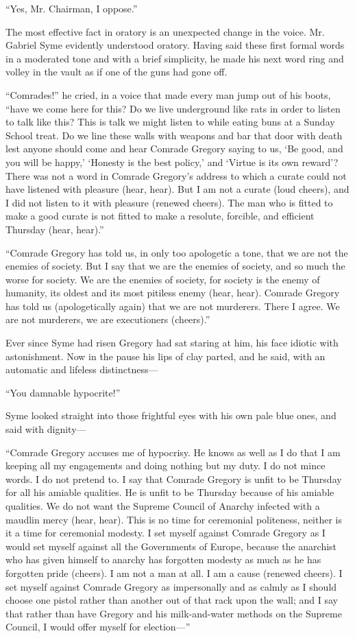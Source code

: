 “Yes, Mr. Chairman, I oppose.”

The most effective fact in oratory is an unexpected change in the voice. Mr. Gabriel Syme evidently understood oratory. Having said these first formal words in a moderated tone and with a brief simplicity, he made his next word ring and volley in the vault as if one of the guns had gone off.

“Comrades!” he cried, in a voice that made every man jump out of his boots, “have we come here for this? Do we live underground like rats in order to listen to talk like this? This is talk we might listen to while eating buns at a Sunday School treat. Do we line these walls with weapons and bar that door with death lest anyone should come and hear Comrade Gregory saying to us, ‘Be good, and you will be happy,’ ‘Honesty is the best policy,’ and ‘Virtue is its own reward’? There was not a word in Comrade Gregory’s address to which a curate could not have listened with pleasure (hear, hear). But I am not a curate (loud cheers), and I did not listen to it with pleasure (renewed cheers). The man who is fitted to make a good curate is not fitted to make a resolute, forcible, and efficient Thursday (hear, hear).”

“Comrade Gregory has told us, in only too apologetic a tone, that we are not the enemies of society. But I say that we are the enemies of society, and so much the worse for society. We are the enemies of society, for society is the enemy of humanity, its oldest and its most pitiless enemy (hear, hear). Comrade Gregory has told us (apologetically again) that we are not murderers. There I agree. We are not murderers, we are executioners (cheers).”

Ever since Syme had risen Gregory had sat staring at him, his face idiotic with astonishment. Now in the pause his lips of clay parted, and he said, with an automatic and lifeless distinctness⁠—

“You damnable hypocrite!”

Syme looked straight into those frightful eyes with his own pale blue ones, and said with dignity⁠—

“Comrade Gregory accuses me of hypocrisy. He knows as well as I do that I am keeping all my engagements and doing nothing but my duty. I do not mince words. I do not pretend to. I say that Comrade Gregory is unfit to be Thursday for all his amiable qualities. He is unfit to be Thursday because of his amiable qualities. We do not want the Supreme Council of Anarchy infected with a maudlin mercy (hear, hear). This is no time for ceremonial politeness, neither is it a time for ceremonial modesty. I set myself against Comrade Gregory as I would set myself against all the Governments of Europe, because the anarchist who has given himself to anarchy has forgotten modesty as much as he has forgotten pride (cheers). I am not a man at all. I am a cause (renewed cheers). I set myself against Comrade Gregory as impersonally and as calmly as I should choose one pistol rather than another out of that rack upon the wall; and I say that rather than have Gregory and his milk-and-water methods on the Supreme Council, I would offer myself for election⁠—”

